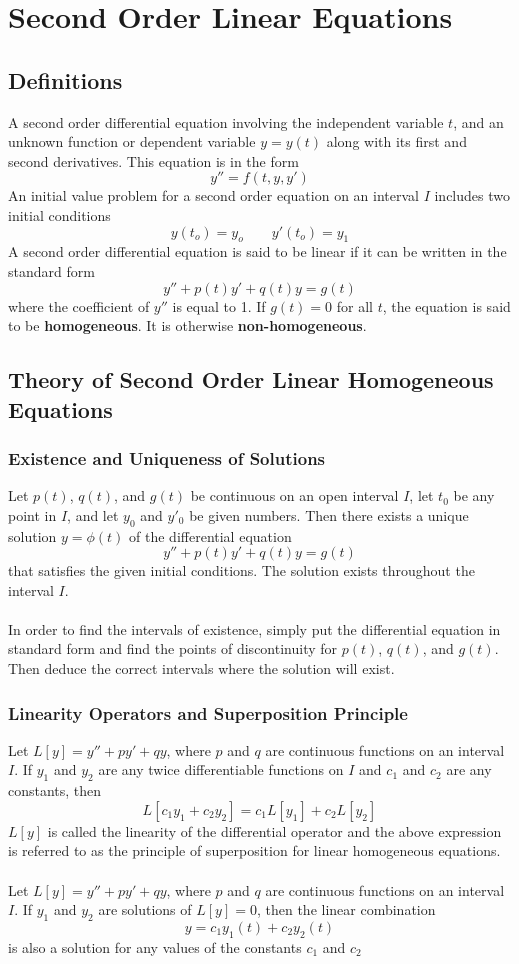\documentclass[11pt]{article}
\begin{document}
\pagebreak


\section{Second Order Linear Equations}
\subsection{Definitions}
A second order differential equation involving the independent variable $t$, and an unknown function or dependent variable $y = y(t)$ along with its first and second derivatives. This equation is in the form
$$ y'' = f(t, y, y')$$
An initial value problem for a second order equation on an interval $I$ includes two initial conditions
$$ y(t_o) = y_o \quad \quad y'(t_o) = y_1$$
A second order differential equation is said to be linear if it can be written in the standard form
$$y'' + p(t)y' +q(t)y = g(t)$$
where the coefficient of $y''$ is equal to 1. If $g(t)=0$ for all $t$, the equation is said to be \textbf{homogeneous}. It is otherwise \textbf{non-homogeneous}.
\subsection{Theory of Second Order Linear Homogeneous Equations}
\subsubsection{Existence and Uniqueness of Solutions}
Let $p(t)$, $q(t)$, and $g(t)$ be continuous on an open interval $I$, let $t_0$ be any point in $I$, and let $y_0$ and $y'_0$ be given numbers. Then there exists a unique solution $y= \phi(t)$ of the differential equation  $$y'' + p(t)y' +q(t)y = g(t)$$
that satisfies the given initial conditions. The solution exists throughout the interval $I$.\\ \\
In order to find the intervals of existence, simply put the differential equation in standard form and find the points of discontinuity for $p(t)$, $q(t)$, and $g(t)$. Then deduce the correct intervals where the solution will exist.
\subsubsection{Linearity Operators and Superposition Principle}
Let $L[y] = y''+py'+qy$, where $p$ and $q$ are continuous functions on an interval $I$. If $y_1$ and $y_2$ are any twice differentiable functions on $I$ and $c_1$ and $c_2$ are any constants, then 
$$L[c_1y_1 + c_2y_2] = c_1L[y_1] + c_2L[y_2]$$ 
$L[y]$ is called the linearity of the differential operator and the above expression is referred to as the principle of superposition for linear homogeneous equations. \\
\\
Let $L[y] = y'' + py' +qy$, where $p$ and $q$ are continuous functions on an interval $I$. If $y_1$ and $y_2$ are solutions of $L[y] = 0$, then the linear combination
$$ y = c_1y_1(t) + c_2y_2(t)$$
is also a solution for any values of the constants $c_1$ and $c_2$
\end{document}
